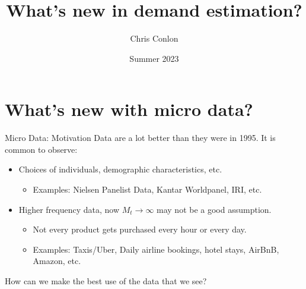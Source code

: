 

\usepackage{lipsum}
\usepackage{amsmath} 
\usepackage{amsthm} 
\usepackage{amssymb} 
\usepackage{mathtools}
\usepackage{dutchcal}


\newcommand{\vect}[1]{\symbf{\symbf{#1}}}
\newcommand{\pd}[2]{\frac{\partial{#1}}{\partial{#2}}}
\newcommand{\expect}[2]{\mathbb{E}_{#1}\left[{#2}\right]}
\newcommand{\expectsmall}[2]{\mathbb{E}_{#1}{#2}}
\newcommand{\expectsuper}[3]{\mathbb{E}_{#1}^{#2}\left[{#3}\right]}
\newcommand{\ind}[1]{\mathbbm{1}\left\{{#1}\right\}}
\newcommand{\prob}[1]{\mathbb{P}\left\{{#1}\right\}}
\newcommand{\derivative}[2]{\frac{d{#2}}{d{#1}}}
\newcommand{\cat}[1]{\citeasnoun{#1}}

\title{What's new in demand estimation?}
\author{Chris Conlon}

\date{Summer 2023}








\begin{frame}[plain] %
\titlepage
\end{frame}


\section*{What's new with micro data?}

\begin{frame}{Micro Data: Motivation}
Data are a lot better than they were in 1995. It is common to observe:
\begin{itemize}
\item Choices of individuals, demographic characteristics, etc.
\begin{itemize}
\item Examples: Nielsen Panelist Data, Kantar Worldpanel, IRI, etc.
\end{itemize}
\item Higher frequency data, now $M_t \rightarrow \infty$ may not be a good assumption.
\begin{itemize}
    \item Not every product gets purchased every hour or every day.
    \item Examples: Taxis/Uber, Daily airline bookings, hotel stays, AirBnB, Amazon, etc.
\end{itemize}
\end{itemize}
How can we make the best use of the data that we see?
\end{frame}


